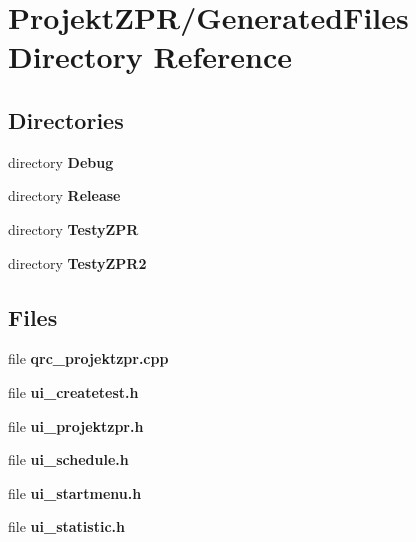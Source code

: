 \section{Projekt\-Z\-P\-R/\-Generated\-Files Directory Reference}
\label{dir_6f14beb5f97d45ed4423611bec57eebe}
\subsection*{Directories}
\begin{DoxyCompactItemize}
\item 
directory {\bf Debug}
\item 
directory {\bf Release}
\item 
directory {\bf Testy\-Z\-P\-R}
\item 
directory {\bf Testy\-Z\-P\-R2}
\end{DoxyCompactItemize}
\subsection*{Files}
\begin{DoxyCompactItemize}
\item 
file {\bf qrc\-\_\-projektzpr.\-cpp}
\item 
file {\bf ui\-\_\-createtest.\-h}
\item 
file {\bf ui\-\_\-projektzpr.\-h}
\item 
file {\bf ui\-\_\-schedule.\-h}
\item 
file {\bf ui\-\_\-startmenu.\-h}
\item 
file {\bf ui\-\_\-statistic.\-h}
\end{DoxyCompactItemize}
